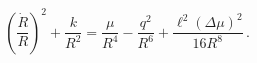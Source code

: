 \begin{equation}\left(\frac{\dot{R}}{R}\right)^2+\frac{k}{R^2}=
\frac{\mu}{R^4}-\frac{q^2}{R^6}+\frac{\ell^2(\Delta\mu)^2}{16 R^8}\,.
\label{FRW-asym}
\end{equation}

